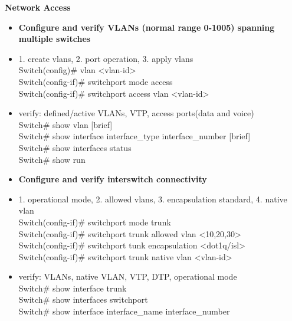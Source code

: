 \documentclass{article}
\begin{document}
\begin{flushleft}\textbf{Network Access}\end{flushleft}
\begin{itemize}
  \item \textbf{Configure and verify VLANs (normal range 0-1005) spanning multiple switches}
	\item[] 1. create vlans, 2. port operation, 3. apply vlans\\
		Switch(config)\# vlan \textless vlan-id\textgreater\\
		Switch(config-if)\# switchport mode access\\
		Switch(config-if)\# switchport access vlan \textless vlan-id\textgreater
  	\item[] verify: defined/active VLANs, VTP, access ports(data and voice)\\
  		Switch\# show vlan [brief]\\
  		Switch\# show interface interface\_type interface\_number [brief]\\
  		Switch\# show interfaces status\\
  		Switch\# show run
  	
  \item \textbf{Configure and verify interswitch connectivity}
  	\item[] 1. operational mode, 2. allowed vlans, 3. encapsulation standard, 4. native vlan\\
  		Switch(config-if)\# switchport mode trunk\\
  		Switch(config-if)\# switchport trunk allowed vlan \textless 10,20,30\textgreater\\
  		Switch(config-if)\# switchport tunk encapsulation \textless dot1q/isl\textgreater\\
  		Switch(config-if)\# switchport trunk native vlan \textless vlan-id\textgreater
  	\item[] verify: VLANs, native VLAN, VTP, DTP, operational mode \\
  		Switch\# show interface trunk\\
  		Switch\# show interfaces switchport\\
  		Switch\# show interface interface\_name interface\_number
  		

\end{itemize}
\end{document}
